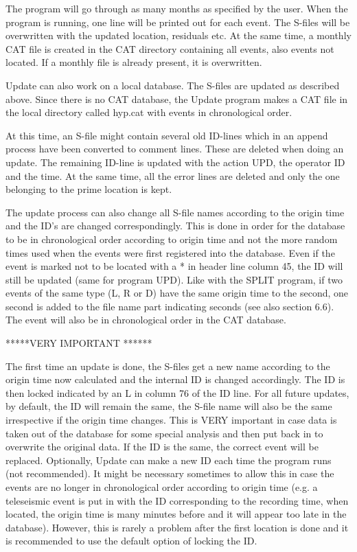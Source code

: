 The program will go through as many months as specified by the user. When the program is running, one line will be printed out for each event. The S-files will be overwritten with the updated location, residuals etc. At the same time, a monthly CAT file is created in the CAT directory containing all events, also events not located. If a monthly file is already present, it is overwritten. 

Update can also work on a local database. The S-files are updated as described above. Since there is no CAT database, the Update program makes a CAT file in the local directory called hyp.cat with events in chronological order. 

At this time, an S-file might contain several old ID-lines which in an append process have been converted to comment lines. These are deleted when doing an update. The remaining ID-line is updated with the action UPD, the operator ID and the time. At the same time, all the error lines are deleted and only the one belonging to the prime location is kept. 

The update process can also change all S-file names according to the origin time and the ID's are changed correspondingly. This is done in order for the database to be in chronological order according to origin time and not the more random times used when the events were first registered into the database. Even if the event is marked not to be located with a * in header line column 45, the ID will still be updated (same for program UPD). Like with the SPLIT program, if two events of the same type (L, R or D) have the same origin time to the second, one second is added to the file name part indicating seconds (see also section 6.6). The event will also be in chronological order in the CAT database. 

*****VERY IMPORTANT ****** 

The first time an update is done, the S-files get a new name according to the origin time now calculated and the internal ID is changed accordingly. The ID is then locked indicated by an L in column 76 of the ID line. For all future updates, by default, the ID will remain the same, the S-file name will also be the same irrespective if the origin time changes. This is VERY important in case data is taken out of the database for some special analysis and then put back in to overwrite the original data. If the ID is the same, the correct event will be replaced. Optionally, Update can make a new ID each time the program runs (not recommended). It might be necessary sometimes to allow this in case the events are no longer in chronological order according to origin time (e.g. a teleseismic event is put in with the ID corresponding to the recording time, when located, the origin time is many minutes before and it will appear too late in the database). However, this is rarely a problem after the first location is done and it is recommended to use the default option of locking the ID. 


